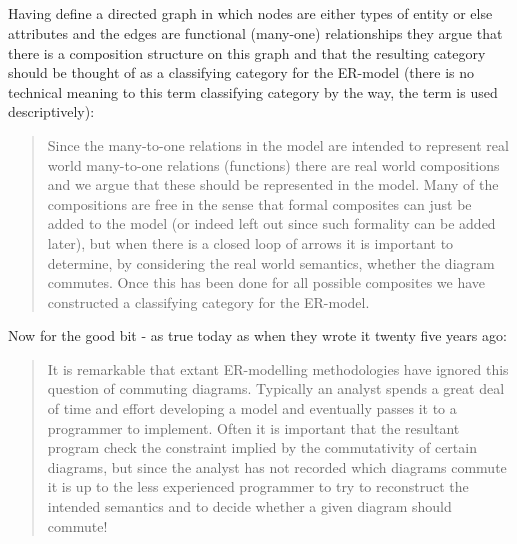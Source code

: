 \documentclass[11pt,a4paper]{scrartcl}
\begin{document}
\subsection{\cite{Johnson93}      }
Having define a directed graph in which nodes are either types of entity or
else attributes and the edges are functional (many-one) relationships
they argue that there is a composition structure on this graph
and that the resulting category should be thought of as a classifying category
for the ER-model (there is no technical meaning to this term classifying category by the way, 
the term is used descriptively):
\begin{quote}
Since the many-to-one relations in the
model are intended to represent real world many-to-one relations (functions)
there are real world compositions and we argue that these should be represented
in the model. Many of the compositions are free in the sense that formal 
composites can just be added to the model (or indeed left out since such formality
can be added later), but when there is a closed loop of arrows it is important to
determine, by considering the real world semantics, whether the diagram commutes. 
Once this has been done for all possible composites we have constructed
a classifying category for the ER-model.
\end{quote}

Now for the good bit - as true today as when they wrote it twenty five years ago:
\begin{quote}
It is remarkable that extant ER-modelling methodologies have ignored this
question of commuting diagrams. Typically an analyst spends a great deal of
time and effort developing a model and eventually passes it to a programmer
to implement. Often it is important that the resultant program check the 
constraint implied by the commutativity of certain diagrams, but since the analyst
has not recorded which diagrams commute it is up to the less experienced 
programmer to try to reconstruct the intended semantics and to decide whether a
given diagram should commute!
\end{quote}
\end{document}
